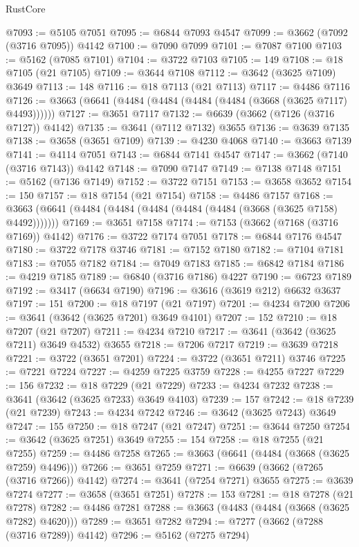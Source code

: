 \begin{lexlean}{RustCore}
\begin{coremodule}
@7093 := @5105 @7051
@7095 := @6844 @7093 @4547
@7099 := @3662 (@7092 (@3716 @7095)) @4142
@7100 := @7090 @7099
@7101 := @7087 @7100
@7103 := @5162 (@7085 @7101)
@7104 := @3722 @7103
@7105 := 149
@7108 := @18 @7105 (@21 @7105)
@7109 := @3644 @7108
@7112 := @3642 (@3625 @7109) @3649
@7113 := 148
@7116 := @18 @7113 (@21 @7113)
@7117 := @4486 @7116
@7126 := @3663 (@6641 (@4484 (@4484 (@4484 (@4484 (@3668 (@3625 @7117) @4493))))))
@7127 := @3651 @7117
@7132 := @6639 (@3662 (@7126 (@3716 @7127)) @4142)
@7135 := @3641 (@7112 @7132) @3655
@7136 := @3639 @7135
@7138 := @3658 (@3651 @7109)
@7139 := @4230 @4068
@7140 := @3663 @7139
@7141 := @4114 @7051
@7143 := @6844 @7141 @4547
@7147 := @3662 (@7140 (@3716 @7143)) @4142
@7148 := @7090 @7147
@7149 := @7138 @7148
@7151 := @5162 (@7136 @7149)
@7152 := @3722 @7151
@7153 := @3658 @3652
@7154 := 150
@7157 := @18 @7154 (@21 @7154)
@7158 := @4486 @7157
@7168 := @3663 (@6641 (@4484 (@4484 (@4484 (@4484 (@4484 (@3668 (@3625 @7158) @4492)))))))
@7169 := @3651 @7158
@7174 := @7153 (@3662 (@7168 (@3716 @7169)) @4142)
@7176 := @3722 @7174 @7051
@7178 := @6844 @7176 @4547
@7180 := @3722 @7178 @3746
@7181 := @7152 @7180
@7182 := @7104 @7181
@7183 := @7055 @7182
@7184 := @7049 @7183
@7185 := @6842 @7184
@7186 := @4219 @7185
@7189 := @6840 (@3716 @7186) @4227
@7190 := @6723 @7189
@7192 := @3417 (@6634 @7190)
@7196 := @3616 (@3619 @212) @6632 @3637
@7197 := 151
@7200 := @18 @7197 (@21 @7197)
@7201 := @4234 @7200
@7206 := @3641 (@3642 (@3625 @7201) @3649 @4101)
@7207 := 152
@7210 := @18 @7207 (@21 @7207)
@7211 := @4234 @7210
@7217 := @3641 (@3642 (@3625 @7211) @3649 @4532) @3655
@7218 := @7206 @7217
@7219 := @3639 @7218
@7221 := @3722 (@3651 @7201)
@7224 := @3722 (@3651 @7211) @3746
@7225 := @7221 @7224
@7227 := @4259 @7225 @3759
@7228 := @4255 @7227
@7229 := 156
@7232 := @18 @7229 (@21 @7229)
@7233 := @4234 @7232
@7238 := @3641 (@3642 (@3625 @7233) @3649 @4103)
@7239 := 157
@7242 := @18 @7239 (@21 @7239)
@7243 := @4234 @7242
@7246 := @3642 (@3625 @7243) @3649
@7247 := 155
@7250 := @18 @7247 (@21 @7247)
@7251 := @3644 @7250
@7254 := @3642 (@3625 @7251) @3649
@7255 := 154
@7258 := @18 @7255 (@21 @7255)
@7259 := @4486 @7258
@7265 := @3663 (@6641 (@4484 (@3668 (@3625 @7259) @4496)))
@7266 := @3651 @7259
@7271 := @6639 (@3662 (@7265 (@3716 @7266)) @4142)
@7274 := @3641 (@7254 @7271) @3655
@7275 := @3639 @7274
@7277 := @3658 (@3651 @7251)
@7278 := 153
@7281 := @18 @7278 (@21 @7278)
@7282 := @4486 @7281
@7288 := @3663 (@4483 (@4484 (@3668 (@3625 @7282) @4620)))
@7289 := @3651 @7282
@7294 := @7277 (@3662 (@7288 (@3716 @7289)) @4142)
@7296 := @5162 (@7275 @7294)

\end{coremodule}
\end{lexlean}
